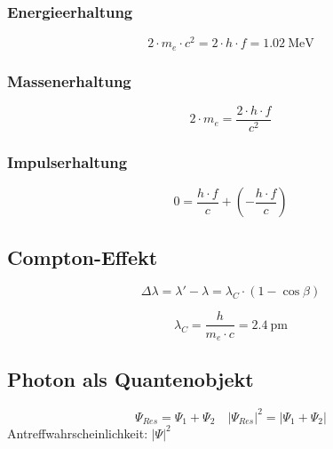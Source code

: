 \subsubsection{Energieerhaltung}
\begin{equation}\label{eq:zerstrahlung:energieerhaltung}
2\cdot m_e \cdot c^2 = 2 \cdot h \cdot f =
\SI{1.02}{\mega\electronvolt}
\end{equation}

\subsubsection{Massenerhaltung}
\begin{equation}\label{eq:zerstrahlung:massenerhaltung}
2 \cdot m_e = \frac{2 \cdot h\cdot f}{c^2}
\end{equation}

\subsubsection{Impulserhaltung}
\begin{equation}\label{eq:zerstrahlung:impulserhaltung}
0 = \frac{h \cdot f}{c} + \left( - \frac{h \cdot f}{c} \right) 
\end{equation}

\subsection{Compton-Effekt}
\begin{equation}\label{eq:compton:effekt}
\Delta \lambda = \lambda' - \lambda = \lambda_C \cdot \left(1 - \cos\beta
\right)
\end{equation}

\begin{equation}\label{eq:compton:wellenlaenge}
\lambda_C = \frac{h}{m_e \cdot c} = \SI{2.4}{\pico\meter}
\end{equation}

\subsection{Photon als Quantenobjekt}
\begin{equation}\label{eq:photonquantenobjekt}
\Psi_{Res} = \Psi_1 + \Psi_2 \quad \left|\Psi_{Res}\right|^2 = \left|\Psi_1 +
\Psi_2\right|
\end{equation}
Antreffwahrscheinlichkeit: $\left|\Psi\right|^2$
